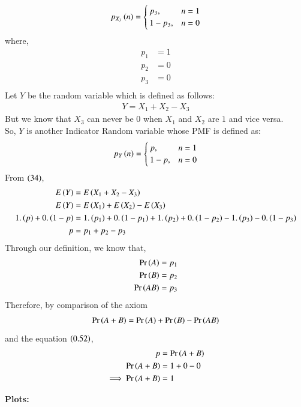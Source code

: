 \documentclass[journal]{IEEEtran}
\begin{document}
\begin{align}
	p_{X_3}\left(n\right) =
	\begin{cases}
		p_3 ,& n = 1\\
		1 - p_3 ,& n = 0
	\end{cases}
\end{align}
where,
\begin{align}
	p_1 &= 1\\
	p_2 &= 0\\
	p_3 &= 0\\
\end{align}
Let $Y$ be the random variable which is defined as follows:
\begin{align}
	Y = X_1 + X_2 - X_3
\end{align}
But we know that $X_3$ can never be $0$ when $X_1$ and $X_2$ are $1$ and vice versa.\\
So, $Y$ is another Indicator Random variable whose PMF is defined as:
\begin{align}
	p_{Y}\left(n\right) =
	\begin{cases}
		p ,& n = 1\\
		1 - p ,& n = 0
	\end{cases}
\end{align}
From $\left(34\right)$,
\begin{align}
	E\left(Y\right) &= E\left(X_1 + X_2 - X_3\right)\\
	E\left(Y\right) &= E\left(X_1\right) + E\left(X_2\right) - E\left(X_3\right)\\
	1.\left(p\right) + 0.\left(1 - p\right) &= 1.\left(p_1\right) + 0.\left(1 - p_1\right) + 1.\left(p_2\right) + 0.\left(1 - p_2\right) - 1.\left(p_3\right) - 0.\left(1 - p_3\right)\\
	p &= p_1 + p_2 - p_3
\end{align}
Through our definition, we know that,
\begin{align}
	\Pr\left(A\right) = p_1\\
	\Pr\left(B\right) = p_2\\
	\Pr\left(AB\right) = p_3
\end{align}
Therefore, by comparison of the axiom
\begin{align}
	\Pr\left(A + B\right) = \Pr\left(A\right) + \Pr\left(B\right) - \Pr\left(AB\right)
\end{align}
and the equation $\left(0.52\right)$,
\begin{align}
	p &= \Pr\left(A + B\right)\\
	\Pr\left(A + B\right) &= 1 + 0 - 0\\
	\implies \Pr\left(A + B\right) &= 1
\end{align}

\newpage 
\textbf{Plots:}\\
\end{document}

